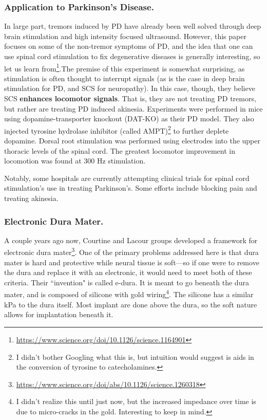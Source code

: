 \documentclass[12pt]{report}
\begin{document}
\subsubsection{Application to Parkinson's Disease.}

In large part, tremors induced by PD have already been well solved through deep brain stimulation and high intensity focused ultrasound. However, this paper focuses on some of the non-tremor symptoms of PD, and the idea that one can use spinal cord stimulation to fix degenerative diseases is generally interesting, so let us learn from\footnote{\url{https://www.science.org/doi/10.1126/science.1164901}}.The premise of this experiment is somewhat surprising, as stimulation is often thought to interrupt signals (as is the case in deep brain stimulation for PD, and SCS for neuropathy). In this case, though, they believe SCS \textbf{enhances locomotor signals}. That is, they are not treating PD tremors, but rather are treating PD induced akinesia. Experiments were performed in mice using dopamine-transporter knockout (DAT-KO) as their PD model. They also injected tyrosine hydrolase inhibitor (called AMPT)\footnote{I didn't bother Googling what this is, but intuition would suggest is aids in the conversion of tyrosine to catecholamines.} to further deplete dopamine. Dorsal root stimulation was performed using electrodes into the upper thoracic levels of the spinal cord. The greatest locomotor improvement in locomotion was found at 300 Hz stimulation.\newline

Notably, some hospitals are currently attempting clinical trials for spinal cord stimulation's use in treating Parkinson's. Some efforts include blocking pain and treating akinesia. 

\subsubsection{Electronic Dura Mater.}

A couple years ago now, Courtine and Lacour groups developed a framework for electronic dura mater\footnote{\url{https://www.science.org/doi/abs/10.1126/science.1260318}}. One of the primary problems addressed here is that dura mater is hard and protective while neural tissue is soft---so if one were to remove the dura and replace it with an electronic, it would need to meet both of these criteria. Their ``invention" is called e-dura. It is meant to go beneath the dura mater, and is composed of silicone with gold wiring\footnote{I didn't realize this until just now, but the increased impedance over time is due to micro-cracks in the gold. Interesting to keep in mind.}. The silicone has a similar kPa to the dura itself. Most implant are done above the dura, so the soft nature allows for implantation beneath it.\newline
\end{document}
